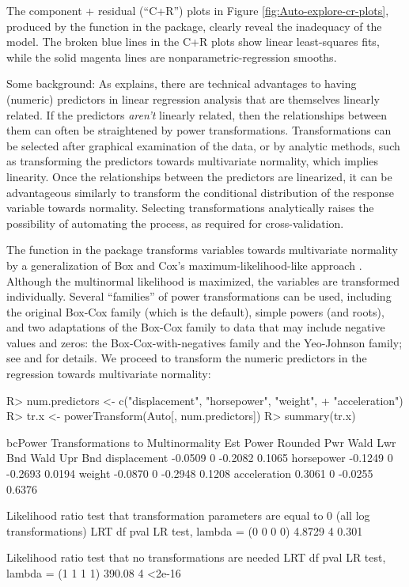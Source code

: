 \documentclass[
]{jss}
\begin{document}
The component + residual (``C+R'') plots in Figure
\ref{fig:Auto-explore-cr-plots}, produced by the 
function in the  package, clearly reveal the inadequacy of the
model. The broken blue lines in the C+R plots show linear least-squares
fits, while the solid magenta lines are nonparametric-regression
smooths.

Some background: As \citet[Sec. 8.2]{Weisberg:2014} explains, there are
technical advantages to having (numeric) predictors in linear regression
analysis that are themselves linearly related. If the predictors
\emph{aren't} linearly related, then the relationships between them can
often be straightened by power transformations. Transformations can be
selected after graphical examination of the data, or by analytic
methods, such as transforming the predictors towards multivariate
normality, which implies linearity. Once the relationships between the
predictors are linearized, it can be advantageous similarly to transform
the conditional distribution of the response variable towards normality.
Selecting transformations analytically raises the possibility of
automating the process, as required for cross-validation.

The  function in the  package transforms
variables towards multivariate normality by a generalization of Box and
Cox's maximum-likelihood-like approach \citep{BoxCox:1964}. Although the
multinormal likelihood is maximized, the variables are transformed
individually. Several ``families'' of power transformations can be used,
including the original Box-Cox family (which is the default), simple
powers (and roots), and two adaptations of the Box-Cox family to data
that may include negative values and zeros: the Box-Cox-with-negatives
family and the Yeo-Johnson family; see \citet[Chap. 8]{Weisberg:2014}
and \citet[Chap. 3]{FoxWeisberg:2019} for details. We proceed to
transform the numeric predictors in the  regression towards
multivariate normality:

\begin{CodeChunk}
\begin{CodeInput}
R> num.predictors <- c("displacement", "horsepower", "weight",
+                     "acceleration")
R> tr.x <- powerTransform(Auto[, num.predictors])
R> summary(tr.x)
\end{CodeInput}
\begin{CodeOutput}
bcPower Transformations to Multinormality
             Est Power Rounded Pwr Wald Lwr Bnd Wald Upr Bnd
displacement   -0.0509           0      -0.2082       0.1065
horsepower     -0.1249           0      -0.2693       0.0194
weight         -0.0870           0      -0.2948       0.1208
acceleration    0.3061           0      -0.0255       0.6376

Likelihood ratio test that transformation parameters are equal to 0
 (all log transformations)
                               LRT df  pval
LR test, lambda = (0 0 0 0) 4.8729  4 0.301

Likelihood ratio test that no transformations are needed
                               LRT df   pval
LR test, lambda = (1 1 1 1) 390.08  4 <2e-16
\end{CodeOutput}
\end{CodeChunk}
\end{document}
